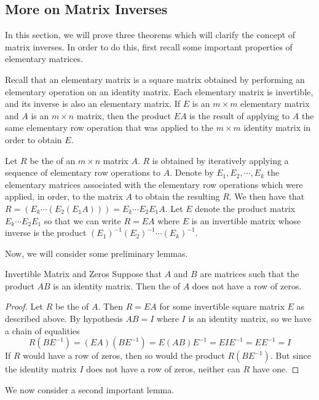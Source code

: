 \subsection{More on Matrix Inverses}

In this section, we will prove three theorems which will clarify the concept of matrix inverses. In order to do this, first recall some important properties of elementary matrices. 

Recall that an elementary matrix is a square matrix obtained by performing an elementary operation on an identity matrix. Each elementary matrix is invertible, and its inverse is also an elementary matrix. If $E$ is an $m \times m$ elementary matrix and $A$ is an $m \times n$ matrix, then the product $EA$ is the result of applying to $A$ the same elementary row operation that was applied to the $m \times m$ identity matrix in order to obtain $E$.

Let $R$ be the \rref \;of an $m \times n$ matrix $A$. $R$ is obtained by iteratively applying a sequence of elementary row operations to $A$. Denote by $E_1, E_2, \cdots, E_k$ the elementary matrices associated with the elementary row operations which were applied, in order, to the matrix $A$ to obtain the resulting $R$. We then have that $R = \left( E_k \cdots \left( E_2 \left( E_1A \right) \right)\right) = E_k \cdots E_2E_1A$. Let $E$ denote the product matrix $E_k \cdots E_2E_1$ so that we can write $R=EA$ where $E$ is an invertible matrix whose inverse is the product $(E_1)^{-1}(E_2)^{-1} \cdots (E_k)^{-1}$.

Now, we will consider some preliminary lemmas. 

\begin{lemma}{Invertible Matrix and Zeros}\label{lem:nozerorow}
Suppose that $A$ and $B$ are matrices such that the product $AB$ is an identity matrix. Then the \rref \;of $A$ does not have a row of zeros.
\end{lemma}
\ifdefined\showproofs
\begin{proof}
Let $R$ be the \rref \;of $A$. Then $R=EA$ for some invertible square matrix $E$ as described above. By hypothesis $AB=I$ where $I$ is an identity matrix, so we have a chain of equalities
\begin{equation*}
R(BE^{-1})
=
(EA)(BE^{-1})
=
E(AB)E^{-1}
=
EIE^{-1}
=
EE^{-1}
=
I
\end{equation*}
If $R$ would have a row of zeros, then so would the product $R(BE^{-1})$. But since the identity matrix $I$ does not have a row of zeros, neither can $R$ have one.
\end{proof}
\fi
We now consider a second important lemma.

